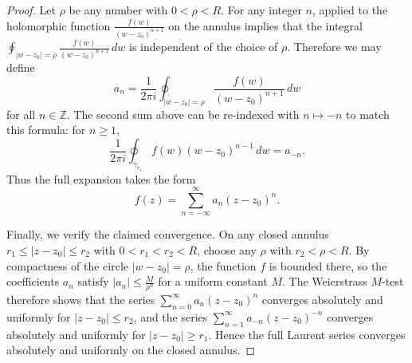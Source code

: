 \begin{proof}
    Let $\rho$ be any number with $0 < \rho < R$. For any integer $n$,  applied to the holomorphic function $\frac{f(w)}{(w - z_0)^{n+1}}$ on the annulus implies that the integral $\oint_{|w - z_0| = \rho} \frac{f(w)}{(w - z_0)^{n+1}}\,dw$ is independent of the choice of $\rho$. Therefore we may define
    $$a_n = \frac{1}{2\pi i} \oint_{|w - z_0| = \rho} \frac{f(w)}{(w - z_0)^{n+1}}\,dw$$
    for all $n \in \mathbb{Z}$. The second sum above can be re-indexed with $n \mapsto -n$ to match this formula: for $n \geq 1$,
    $$\frac{1}{2\pi i} \oint_{\gamma_{r_1}} f(w)(w - z_0)^{n-1}\,dw = a_{-n}.$$
    Thus the full expansion takes the form
    $$f(z) = \sum_{n=-\infty}^{\infty} a_n (z - z_0)^n.$$

    Finally, we verify the claimed convergence. On any closed annulus $r_1 \leq |z - z_0| \leq r_2$ with $0 < r_1 < r_2 < R$, choose any $\rho$ with $r_2 < \rho < R$. By compactness of the circle $|w - z_0| = \rho$, the function $f$ is bounded there, so the coefficients $a_n$ satisfy $|a_n| \leq \frac{M}{\rho^n}$ for a uniform constant $M$. The Weierstrass $M$-test therefore shows that the series $\sum_{n=0}^{\infty} a_n (z - z_0)^n$ converges absolutely and uniformly for $|z - z_0| \leq r_2$, and the series $\sum_{n=1}^{\infty} a_{-n} (z - z_0)^{-n}$ converges absolutely and uniformly for $|z - z_0| \geq r_1$. Hence the full Laurent series converges absolutely and uniformly on the closed annulus.
\end{proof}